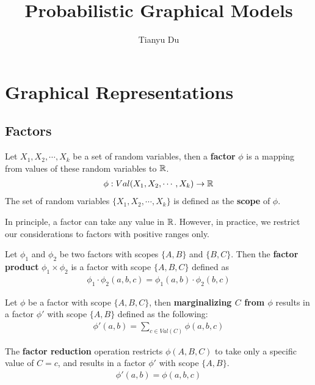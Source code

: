 \documentclass[11pt]{article}
\title{Probabilistic Graphical Models}
\author{Tianyu Du}
\begin{document}
	\maketitle
	\section{Graphical Representations}
	\subsection{Factors}
	\begin{definition}
		Let $X_1, X_2, \cdots, X_k$ be a set of random variables, then a \textbf{factor} $\phi$ is a mapping from values of these random variables to $\mathbb{R}$.
		\begin{align}
			\phi: Val(X_1, X_2, \cdots, X_k) \to \mathbb{R}
		\end{align}
		The set of random variables $\{X_1, X_2, \cdots, X_k\}$ is defined as the \textbf{scope} of $\phi$.
	\end{definition}
	
	\begin{remark}
		In principle, a factor can take any value in $\mathbb{R}$. However, in practice, we restrict our considerations to factors with positive ranges only.
	\end{remark}
	
	\begin{definition}
		Let $\phi_1$ and $\phi_2$ be two factors with scopes $\{A,B\}$ and $\{B, C\}$.
		Then the \textbf{factor product} $\phi_1 \times \phi_2$ is a factor with scope $\{A, B, C\}$ defined as
		\begin{align}
			\phi_1 \cdot \phi_2 (a, b, c) = \phi_1(a, b) \cdot \phi_2(b, c)
		\end{align}
	\end{definition}
	
	\begin{definition}
		Let $\phi$ be a factor with scope $\{A, B, C\}$, then \textbf{marginalizing $C$ from $\phi$} results in a factor $\phi'$ with scope $\{A, B\}$ defined as the following:
		\begin{align}
			\phi'(a, b) = \sum_{c \in Val(C)} \phi(a, b, c)
		\end{align}
	\end{definition}
	
	\begin{definition}
		The \textbf{factor reduction} operation restricts $\phi(A,B,C)$ to take only a specific value of $C=c$, and results in a factor $\phi'$ with scope $\{A, B\}$.
		\begin{align}
			\phi'(a, b) = \phi(a, b, c)
		\end{align}
	\end{definition}
	
\end{document}
